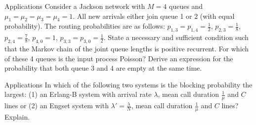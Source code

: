\begin{problem}{Applications}
   Consider a Jackson network with $M = 4$ queues and $\mu_1 = \mu_2 = \mu_3 = \mu_4 = 1$. All new arrivals either join queue 1 or 2 (with equal probability). The routing probabilities are as follows: $ p_{1,3} = p_{1,4} = \frac{1}{2}$, $p_{2,3} = \frac{1}{8}$, $p_{2,4} = \frac{7}{8}$, $p_{4,0} = 1$, $p_{3,3} = p_{3,0} = \frac{1}{2}$. State a necessary and sufficient condition such that the Markov chain of the joint queue lengths is positive recurrent. For which of these 4 queues is the input process Poisson? Derive an expression for the probability that both queue 3 and 4 are empty at the same time.
\end{problem}

\begin{problem}{Applications}
   In which of the following two systems is the blocking probability the largest: (1) an Erlang-B system with arrival rate $\lambda$, mean call duration $\frac{1}{\mu}$ and $C$ lines or (2) an Engset system with $\lambda' = \frac{\lambda}{N}$, mean call duration $\frac{1}{\mu}$ and $C$ lines? Explain.
\end{problem}
